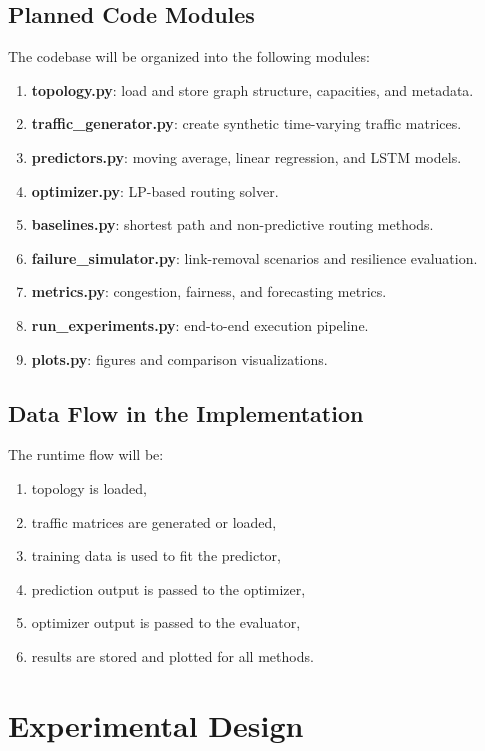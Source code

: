 \documentclass[11pt]{article}
\begin{document}
\subsection{Planned Code Modules}
The codebase will be organized into the following modules:
\begin{enumerate}
    \item \textbf{topology.py}: load and store graph structure, capacities, and metadata.
    \item \textbf{traffic\_generator.py}: create synthetic time-varying traffic matrices.
    \item \textbf{predictors.py}: moving average, linear regression, and LSTM models.
    \item \textbf{optimizer.py}: LP-based routing solver.
    \item \textbf{baselines.py}: shortest path and non-predictive routing methods.
    \item \textbf{failure\_simulator.py}: link-removal scenarios and resilience evaluation.
    \item \textbf{metrics.py}: congestion, fairness, and forecasting metrics.
    \item \textbf{run\_experiments.py}: end-to-end execution pipeline.
    \item \textbf{plots.py}: figures and comparison visualizations.
\end{enumerate}

\subsection{Data Flow in the Implementation}
The runtime flow will be:
\begin{enumerate}
    \item topology is loaded,
    \item traffic matrices are generated or loaded,
    \item training data is used to fit the predictor,
    \item prediction output is passed to the optimizer,
    \item optimizer output is passed to the evaluator,
    \item results are stored and plotted for all methods.
\end{enumerate}

\section{Experimental Design}
\end{document}
